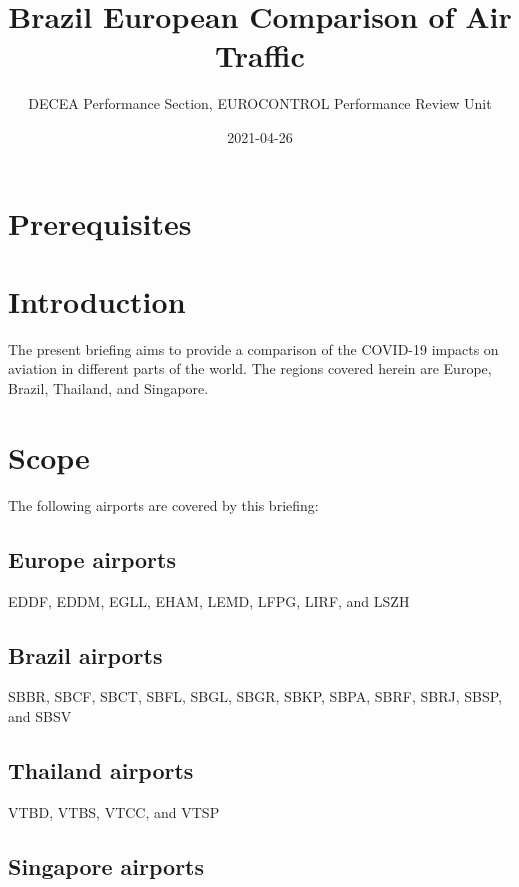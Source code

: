 \documentclass[
]{book}
\title{Brazil European Comparison of Air Traffic}
\author{DECEA Performance Section, EUROCONTROL Performance Review Unit}
\date{2021-04-26}
\begin{document}
\maketitle

{
\setcounter{tocdepth}{1}
\tableofcontents
}
\hypertarget{prerequisites}{%
\chapter{Prerequisites}\label{prerequisites}}

\hypertarget{introduction}{%
\chapter{Introduction}\label{introduction}}

The present briefing aims to provide a comparison of the COVID-19 impacts on aviation in different parts of the world. The regions covered herein are Europe, Brazil, Thailand, and Singapore.

\hypertarget{scope}{%
\chapter{Scope}\label{scope}}

The following airports are covered by this briefing:

\hypertarget{europe-airports}{%
\section{Europe airports}\label{europe-airports}}

EDDF, EDDM, EGLL, EHAM, LEMD, LFPG, LIRF, and LSZH

\hypertarget{brazil-airports}{%
\section{Brazil airports}\label{brazil-airports}}

SBBR, SBCF, SBCT, SBFL, SBGL, SBGR, SBKP, SBPA, SBRF, SBRJ, SBSP, and SBSV

\hypertarget{thailand-airports}{%
\section{Thailand airports}\label{thailand-airports}}

VTBD, VTBS, VTCC, and VTSP

\hypertarget{singapore-airports}{%
\section{Singapore airports}\label{singapore-airports}}
\end{document}
